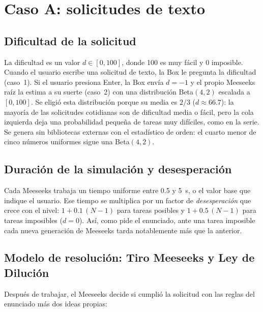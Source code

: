 \documentclass[11pt,letterpaper]{article}
\makeatletter
\newcommand{\codigo}[2]{%
  \edef\lin{\csname line@#1\endcsname}%
  }
\makeatother
\begin{document}
\codigo{work}{Trabajo simulado que sigue escuchando el pipe}

\section{Caso A: solicitudes de texto}\label{sec:a}

\subsection{Dificultad de la solicitud}

La dificultad es un valor $d\in[0,100]$, donde 100 es muy fácil y 0 imposible. Cuando el
usuario escribe una solicitud de texto, la Box le pregunta la dificultad (caso~1). Si el
usuario presiona Enter, la Box envía $d=-1$ y el propio Meeseeks raíz la estima a su
suerte (caso~2) con una distribución Beta$(4,2)$ escalada a $[0,100]$. Se eligió esta
distribución porque su media es $2/3$ ($d\approx 66.7$): la mayoría de las solicitudes
cotidianas son de dificultad media o fácil, pero la cola izquierda deja una probabilidad
pequeña de tareas muy difíciles, como en la serie. Se genera sin bibliotecas externas con
el estadístico de orden: el cuarto menor de cinco números uniformes sigue una Beta$(4,2)$.

\codigo{beta}{Dificultad a la suerte del Meeseeks: Beta(4,2)}

\subsection{Duración de la simulación y desesperación}

Cada Meeseeks trabaja un tiempo uniforme entre 0.5 y 5~s, o el valor base que indique el
usuario. Ese tiempo se multiplica por un factor de \emph{desesperación} que crece con el
nivel: $1+0.1\,(N-1)$ para tareas posibles y $1+0.5\,(N-1)$ para tareas imposibles
($d=0$). Así, como pide el enunciado, ante una tarea imposible cada nueva generación de
Meeseeks tarda notablemente más que la anterior.

\subsection{Modelo de resolución: Tiro Meeseeks y Ley de Dilución}

Después de trabajar, el Meeseeks decide si cumplió la solicitud con las reglas del
enunciado más dos ideas propias:
\end{document}
